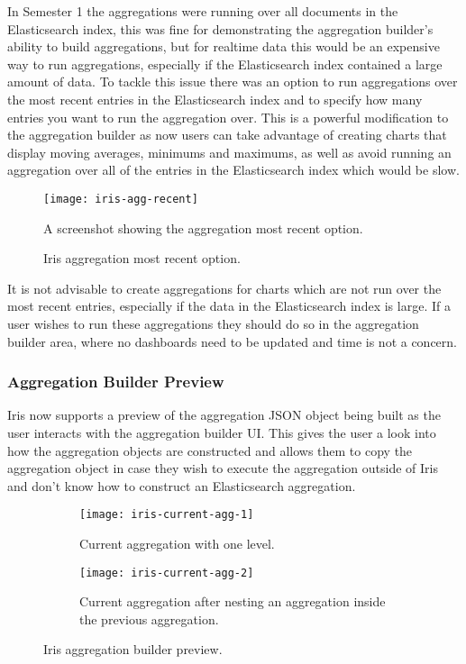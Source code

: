 \documentclass[12pt,a4paper,titlepage]{report}
\begin{document}
In Semester 1 the aggregations were running over all documents in the Elasticsearch index, this was fine for demonstrating the aggregation builder's ability to build aggregations, but for realtime data this would be an expensive way to run aggregations, especially if the Elasticsearch index contained a large amount of data. To tackle this issue there was an option to run aggregations over the most recent entries in the Elasticsearch index and to specify how many entries you want to run the aggregation over. This is a powerful modification to the aggregation builder as now users can take advantage of creating charts that display moving averages, minimums and maximums, as well as avoid running an aggregation over all of the entries in the Elasticsearch index which would be slow. 
\begin{figure}[H]
\begin{tcolorbox}
\begin{center}
\texttt{[image: iris-agg-recent]}
\end{center}
A screenshot showing the aggregation most recent option.
\end{tcolorbox}
\caption{Iris aggregation most recent option.}
\end{figure}

It is not advisable to create aggregations for charts which are not run over the most recent entries, especially if the data in the Elasticsearch index is large. If a user wishes to run these aggregations they should do so in the aggregation builder area, where no dashboards need to be updated and time is not a concern.

\subsubsection{Aggregation Builder Preview}
Iris now supports a preview of the aggregation JSON object being built as the user interacts with the aggregation builder UI. This gives the user a look into how the aggregation objects are constructed and allows them to copy the aggregation object in case they wish to execute the aggregation outside of Iris and don't know how to construct an Elasticsearch aggregation.
\begin{figure}[H]
\begin{tcolorbox}
\begin{center}
\begin{subfigure}{0.5\textwidth}
\centering
\texttt{[image: iris-current-agg-1]}
\caption{Current aggregation with one level.}
\end{subfigure}%
\begin{subfigure}{0.5\textwidth}
\centering
\texttt{[image: iris-current-agg-2]}
\caption{Current aggregation after nesting an aggregation inside the previous aggregation.}
\end{subfigure}
\end{center}
\end{tcolorbox}
\caption{Iris aggregation builder preview.}
\end{figure}
\end{document}
